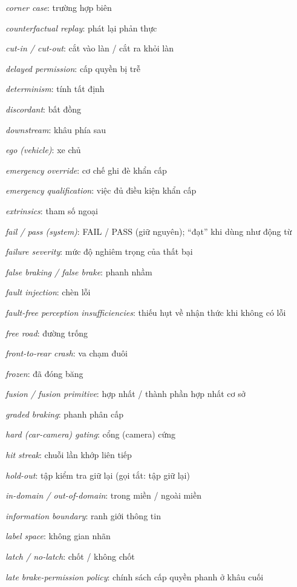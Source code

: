\documentclass[conference]{IEEEtran}
\begin{document}
{\textit{corner case}: trường hợp biên\par
\textit{counterfactual replay}: phát lại phản thực\par
\textit{cut-in / cut-out}: cắt vào làn / cắt ra khỏi làn\par
\textit{delayed permission}: cấp quyền bị trễ\par
\textit{determinism}: tính tất định\par
\textit{discordant}: bất đồng\par
\textit{downstream}: khâu phía sau\par
\textit{ego (vehicle)}: xe chủ\par
\textit{emergency override}: cơ chế ghi đè khẩn cấp\par
\textit{emergency qualification}: việc đủ điều kiện khẩn cấp\par
\textit{extrinsics}: tham số ngoại\par
\textit{fail / pass (system)}: FAIL / PASS (giữ nguyên); “đạt” khi dùng như động từ\par
\textit{failure severity}: mức độ nghiêm trọng của thất bại\par
\textit{false braking / false brake}: phanh nhầm\par
\textit{fault injection}: chèn lỗi\par
\textit{fault-free perception insufficiencies}: thiếu hụt về nhận thức khi không có lỗi\par
\textit{free road}: đường trống\par
\textit{front-to-rear crash}: va chạm đuôi\par
\textit{frozen}: đã đóng băng\par
\textit{fusion / fusion primitive}: hợp nhất / thành phần hợp nhất cơ sở\par
\textit{graded braking}: phanh phân cấp\par
\textit{hard (car-camera) gating}: cổng (camera) cứng\par
\textit{hit streak}: chuỗi lần khớp liên tiếp\par
\textit{hold-out}: tập kiểm tra giữ lại (gọi tắt: tập giữ lại)\par
\textit{in-domain / out-of-domain}: trong miền / ngoài miền\par
\textit{information boundary}: ranh giới thông tin\par
\textit{label space}: không gian nhãn\par
\textit{latch / no-latch}: chốt / không chốt\par
\textit{late brake-permission policy}: chính sách cấp quyền phanh ở khâu cuối\par
}
\end{document}
